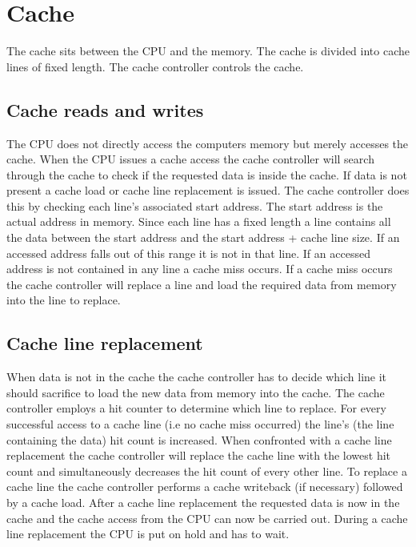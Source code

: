 \section{Cache}

The cache sits between the CPU and the memory. The cache is divided into cache lines of fixed length. The cache controller controls the cache. 

\subsection{Cache reads and writes}

The CPU does not directly access the computers memory but merely accesses the cache. When the CPU issues a cache access the cache controller will search through the cache to check if the requested data is inside the cache. If data is not present a cache load or cache line replacement is issued. The cache controller does this by checking each line's associated start address. The start address is the actual address in memory. Since each line has a fixed length a line contains all the data between the start address and the start address + cache line size. If an accessed address falls out of this range it is not in that line. If an accessed address is not contained in any line a cache miss occurs. If a cache miss occurs the cache controller will replace a line and load the required data from memory into the line to replace. 

\subsection{Cache line replacement}

When data is not in the cache the cache controller has to decide which line it should sacrifice to load the new data from memory into the cache. The cache controller employs a hit counter to determine which line to replace. For every successful access to a cache line (i.e no cache miss occurred) the line's (the line containing the data) hit count is increased. When confronted with a cache line replacement the cache controller will replace the cache line with the lowest hit count and simultaneously decreases the hit count of every other line. To replace a cache line the cache controller performs a cache writeback (if necessary) followed by a cache load. After a cache line replacement the requested data is now in the cache and the cache access from the CPU can now be carried out. During a cache line replacement the CPU is put on hold and has to wait. 

